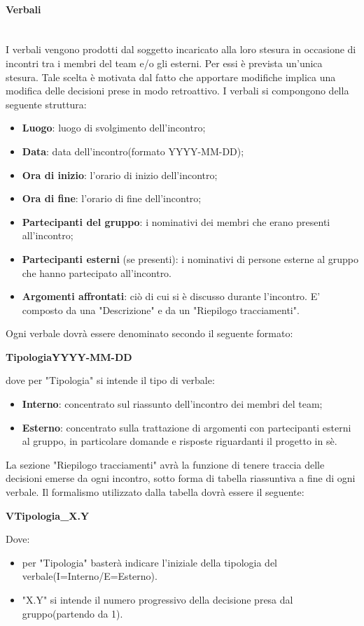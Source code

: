 		\paragraph{Verbali} \mbox{}\\
		I verbali vengono prodotti dal soggetto incaricato alla loro stesura in occasione di incontri tra i membri del team e/o gli esterni. Per essi è prevista un’unica stesura. Tale	scelta è motivata dal fatto che apportare modifiche implica una modifica delle decisioni prese in modo retroattivo.
		I verbali si compongono della seguente struttura:
		\begin{itemize}
			\item \textbf{Luogo}: luogo di svolgimento dell'incontro;
			\item \textbf{Data}: data dell'incontro(formato YYYY-MM-DD);
			\item \textbf{Ora di inizio}: l'orario di inizio dell'incontro;
			\item \textbf{Ora di fine}: l'orario di fine dell'incontro;
			\item \textbf{Partecipanti del gruppo}: i nominativi dei membri che erano presenti all'incontro;
			\item \textbf{Partecipanti esterni} (se presenti): i nominativi di persone esterne al gruppo che hanno partecipato all'incontro.
			\item \textbf{Argomenti affrontati}: ciò di cui si è discusso durante l'incontro. E' composto da una "Descrizione" e da un "Riepilogo tracciamenti".
		\end{itemize}
		Ogni verbale dovrà essere denominato secondo il seguente formato: \newline
		\centerline{\textbf{TipologiaYYYY-MM-DD}} \newline \newline
		dove per "Tipologia" si intende il tipo di verbale:
		\begin{itemize}
			\item \textbf{Interno}: concentrato sul riassunto dell'incontro dei membri del team;
			\item \textbf{Esterno}: concentrato sulla trattazione di argomenti con partecipanti esterni al gruppo, in particolare domande e risposte riguardanti il progetto in sè.
		\end{itemize}
		La sezione "Riepilogo tracciamenti" avrà la funzione di tenere traccia delle decisioni emerse da ogni incontro, sotto forma di tabella riassuntiva a fine di ogni verbale. Il formalismo utilizzato dalla tabella dovrà essere il seguente: \newline
		\centerline{\textbf{VTipologia\_X.Y}} \newline \newline
		Dove:
		\begin{itemize}
			\item per "Tipologia" basterà indicare l'iniziale della tipologia del verbale(I=Interno/E=Esterno).
			\item "X.Y" si intende il numero progressivo della decisione presa dal gruppo(partendo da 1).
		\end{itemize}
